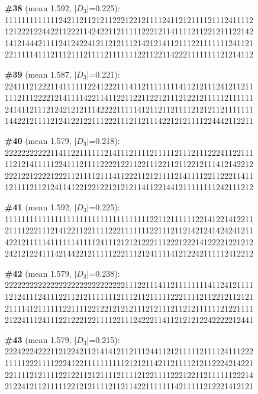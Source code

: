 \documentclass[10pt]{article}
\begin{document}
\noindent\textbf{\#38} (mean 1.592, $|D_3|$=0.225):\\
111111111111124211211212112221221211112411212111121112411112\\
121222122442211222114242211211111222121141111211221211122142\\
141214442111124124224121121211121421214112111221111111241121\\
221111141112111211121111211111112211221142221111111121214112\medskip

\noindent\textbf{\#39} (mean 1.587, $|D_3|$=0.221):\\
224111212221141111112241222111411211111111411212111241211211\\
111211122221214111142211411221122112212111212212111112111111\\
241411211121242121211142222111114121121121111212121121111111\\
144221211112124122122111222111211211142212121111224442112211\medskip

\noindent\textbf{\#40} (mean 1.579, $|D_3|$=0.218):\\
222222222221141122111111214111211112111112111211122241122111\\
112121411111224111211112222122112211122112112212111412142212\\
222122122221222112111121114112221121211112141111221122211411\\
121111211212411412212212212121211411221441211111111242111212\medskip

\noindent\textbf{\#41} (mean 1.592, $|D_3|$=0.225):\\
111111111111111111111111111111111112211211111122141221412211\\
211112221112141221122111122211111112211121121421241424241211\\
422121111141111114111124111212121222111222122214122221221212\\
242121224111421442212111112221112124111141212242111112412212\medskip

\noindent\textbf{\#42} (mean 1.579, $|D_3|$=0.238):\\
222222222222222222222222222221112211141121111111141124121111\\
121241112411122112121111111211121121111122211112112212112121\\
211114121111112211112212212121211121211121121211111121221111\\
212241112411122122212211112211124222114112121212242222212441\medskip

\noindent\textbf{\#43} (mean 1.579, $|D_3|$=0.215):\\
222422242221121224211214141211211124411212111112111124111222\\
111112221111222412211111111112121211421121111212112224214221\\
221111212111122122112121111211112122111122212211211111122214\\
212241211211111221212111121121142211111114211111212221412121\medskip
\end{document}
